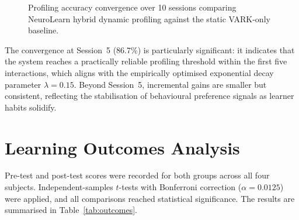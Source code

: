 \begin{figure}[htb]
	\centering
	\caption{Profiling accuracy convergence over 10 sessions comparing NeuroLearn hybrid dynamic profiling against the static VARK-only baseline.}
	\label{fig:profiling_res}
\end{figure}

The convergence at Session~5 (86.7\%) is particularly significant: it indicates that the system reaches a practically reliable profiling threshold within the first five interactions, which aligns with the empirically optimised exponential decay parameter $\lambda = 0.15$. Beyond Session~5, incremental gains are smaller but consistent, reflecting the stabilisation of behavioural preference signals as learner habits solidify.

\section{Learning Outcomes Analysis}

Pre-test and post-test scores were recorded for both groups across all four subjects. Independent-samples $t$-tests with Bonferroni correction ($\alpha = 0.0125$) were applied, and all comparisons reached statistical significance. The results are summarised in Table~\ref{tab:outcomes}.

